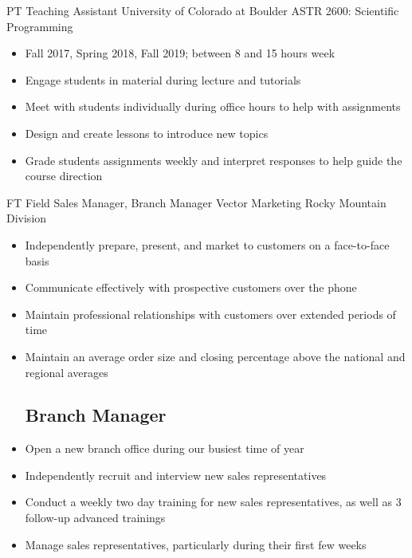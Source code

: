 \documentclass[11pt]{article} %
\begin{document}
    {PT} %
    {Teaching Assistant} %
    {University of Colorado at Boulder} %
    {ASTR 2600: Scientific Programming}
    {\begin{itemize}
    \setlength\itemsep{0.1em} 
        \item Fall 2017, Spring 2018, Fall 2019; between 8 and 15 hours week
        \item Engage students in material during lecture and tutorials
        \item Meet with students individually during office hours to help with assignments
        \item Design and create lessons to introduce new topics
        \item Grade students assignments weekly and interpret responses to help guide the course direction
    \end{itemize}} %


    {FT} %
    {Field Sales Manager, Branch Manager} %
    {Vector Marketing} %
    {Rocky Mountain Division}
    {\begin{itemize}
    \setlength\itemsep{0.1em}
        \subsection*{Field Sales}
            \item Independently prepare, present, and market to customers on a face-to-face basis
            \item Communicate effectively with prospective customers over the phone
            \item Maintain professional relationships with customers over extended periods of time
            \item Maintain an average order size and closing percentage above the national and regional averages
        \subsection*{Branch Manager}
            \item Open a new branch office during our busiest time of year
            \item Independently recruit and interview new sales representatives
            \item Conduct a weekly two day training for new sales representatives, as well as 3 follow-up advanced trainings
\item Manage sales representatives, particularly during their first few weeks
    \end{itemize}
}
\end{document}

